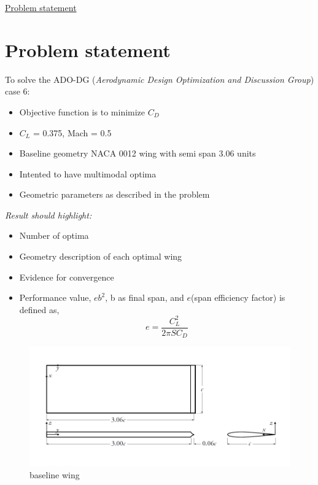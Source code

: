 \begin{frame}{\underline{Problem statement}}
\section{Problem statement}
\small{To solve the ADO-DG  (\textit{Aerodynamic Design Optimization and Discussion Group}) case 6: }
\\[2mm]
\begin{itemize}
\item Objective function is to minimize $C_D$
\item $C_L$ = 0.375, Mach = 0.5
\item Baseline geometry NACA 0012 wing with semi span 3.06 units
\item  Intented to have multimodal optima
\item Geometric parameters as described in the problem
\end{itemize}

\parbox{0.38\linewidth}{
\textit\textit{{Result should highlight:}}
\begin{itemize}
\item Number of optima 
\item Geometry description of each optimal wing
\item Evidence for convergence
\item Performance value, $eb^2$, b as final span, and $e$(span efficiency factor) is defined as,
$$\boxed{
e=\frac{C_{L}^{2}}{2 \pi S C_{D}}
}$$
\end{itemize}
}
\parbox{0.57\linewidth}{
\begin{figure}
    \centering
    \includegraphics[scale = 0.34]{figures/baselinewing.png}
    \caption{baseline wing}
    \label{fig:baseline wing}
\end{figure}
}

\end{frame}